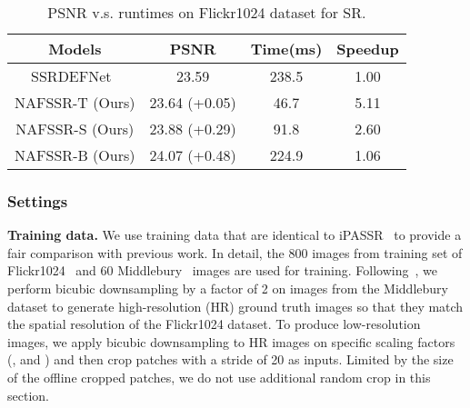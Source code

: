 \documentclass[10pt,twocolumn,letterpaper]{article}
\begin{document}
\begin{table}[]
\centering
\caption{PSNR v.s. runtimes on Flickr1024 dataset for  SR.
}
\vspace{-3mm}
\label{tab:runtime}
\small
\begin{tabular}{cccc}
\toprule
Models    & PSNR & Time(ms) & Speedup \\ \midrule
SSRDEFNet~\cite{dai2021feedback}  & 23.59      & 238.5    & 1.00       \\ \midrule
NAFSSR-T (Ours)  & 23.64 (+0.05)     & 46.7     & 5.11   \\
NAFSSR-S (Ours)  & 23.88 (+0.29)        & 91.8     & 2.60    \\
NAFSSR-B (Ours)  & 24.07 (+0.48)     & 224.9    & 1.06   \\
\bottomrule
\end{tabular}
\vspace{-2mm}
\end{table}


\subsubsection{Settings} 
\textbf{Training data.} We use training data that are identical to iPASSR~\cite{wang2021symmetric} to provide a fair comparison with previous work. In detail, the 800 images from training set of Flickr1024~\cite{wang2019flickr1024} and 60 Middlebury~\cite{scharstein2014high} images are used for training.
Following~\cite{wang2021symmetric}, we perform bicubic downsampling by a factor of 2 on images from the Middlebury dataset to generate high-resolution (HR) ground truth images so that they match the spatial resolution of the Flickr1024 dataset.
To produce low-resolution images, we apply bicubic downsampling to HR images on specific scaling factors (\ie,  and ) and then crop  patches with a stride of 20 as inputs. Limited by the size of the offline cropped patches, we do not use additional random crop in this section. 
\end{document}
